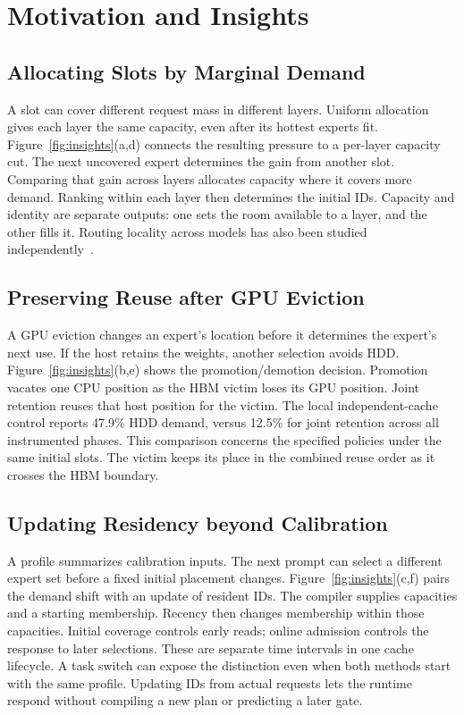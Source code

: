 \documentclass[conference,9pt,letterpaper]{IEEEtran}
\begin{document}
\section{Motivation and Insights}
\label{sec:challenges}
\subsection{Allocating Slots by Marginal Demand}
A slot can cover different request mass in different layers. Uniform allocation gives each layer the same capacity, even after its hottest experts fit. Figure~\ref{fig:insights}(a,d) connects the resulting pressure to a per-layer capacity cut. The next uncovered expert determines the gain from another slot. Comparing that gain across layers allocates capacity where it covers more demand. Ranking within each layer then determines the initial IDs. Capacity and identity are separate outputs: one sets the room available to a layer, and the other fills it. Routing locality across models has also been studied independently~\cite{routingconsistency}.

\subsection{Preserving Reuse after GPU Eviction}
A GPU eviction changes an expert's location before it determines the expert's next use. If the host retains the weights, another selection avoids HDD. Figure~\ref{fig:insights}(b,e) shows the promotion/demotion decision. Promotion vacates one CPU position as the HBM victim loses its GPU position. Joint retention reuses that host position for the victim. The local independent-cache control reports 47.9\% HDD demand, versus 12.5\% for joint retention across all instrumented phases. This comparison concerns the specified policies under the same initial slots. The victim keeps its place in the combined reuse order as it crosses the HBM boundary.

\subsection{Updating Residency beyond Calibration}
A profile summarizes calibration inputs. The next prompt can select a different expert set before a fixed initial placement changes. Figure~\ref{fig:insights}(c,f) pairs the demand shift with an update of resident IDs. The compiler supplies capacities and a starting membership. Recency then changes membership within those capacities. Initial coverage controls early reads; online admission controls the response to later selections. These are separate time intervals in one cache lifecycle. A task switch can expose the distinction even when both methods start with the same profile. Updating IDs from actual requests lets the runtime respond without compiling a new plan or predicting a later gate.
\end{document}
